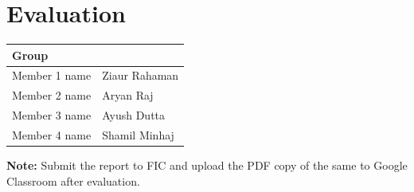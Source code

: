 \documentclass[12pt,a4paper]{article}
\begin{document}
\section*{Evaluation}

\begin{center}
\begin{tabular}{|L{0.35\textwidth}|L{0.45\textwidth}|}
\hline
\textbf{Group} & \\ \hline
Member 1 name & Ziaur Rahaman \\ \hline
Member 2 name & Aryan Raj \\ \hline
Member 3 name & Ayush Dutta \\ \hline
Member 4 name & Shamil Minhaj \\ \hline
\end{tabular}
\end{center}

\textbf{Note:} Submit the report to FIC and upload the PDF copy of the same to
Google Classroom after evaluation.
\end{document}
